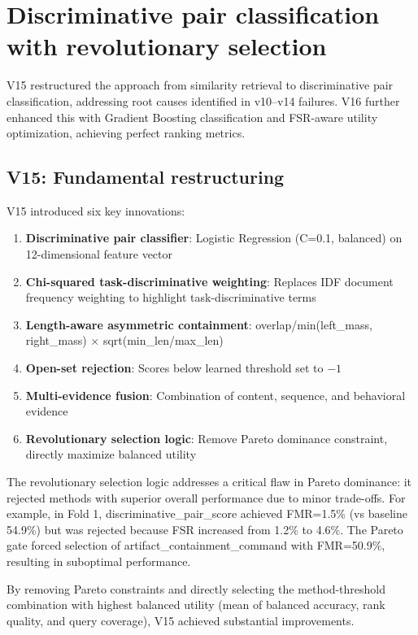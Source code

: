 \section{Discriminative pair classification with revolutionary selection}
\label{sec:balanced-innovation-v15-v16}

V15 restructured the approach from similarity retrieval to discriminative pair classification, addressing root causes identified in v10--v14 failures. V16 further enhanced this with Gradient Boosting classification and FSR-aware utility optimization, achieving perfect ranking metrics.

\subsection{V15: Fundamental restructuring}

V15 introduced six key innovations:
\begin{enumerate}
    \item \textbf{Discriminative pair classifier}: Logistic Regression (C=0.1, balanced) on 12-dimensional feature vector
    \item \textbf{Chi-squared task-discriminative weighting}: Replaces IDF document frequency weighting to highlight task-discriminative terms
    \item \textbf{Length-aware asymmetric containment}: overlap/min(left\_mass, right\_mass) $\times$ sqrt(min\_len/max\_len)
    \item \textbf{Open-set rejection}: Scores below learned threshold set to $-1$
    \item \textbf{Multi-evidence fusion}: Combination of content, sequence, and behavioral evidence
    \item \textbf{Revolutionary selection logic}: Remove Pareto dominance constraint, directly maximize balanced utility
\end{enumerate}

The revolutionary selection logic addresses a critical flaw in Pareto dominance: it rejected methods with superior overall performance due to minor trade-offs. For example, in Fold 1, discriminative\_pair\_score achieved FMR=1.5\% (vs baseline 54.9\%) but was rejected because FSR increased from 1.2\% to 4.6\%. The Pareto gate forced selection of artifact\_containment\_command with FMR=50.9\%, resulting in suboptimal performance.

By removing Pareto constraints and directly selecting the method-threshold combination with highest balanced utility (mean of balanced accuracy, rank quality, and query coverage), V15 achieved substantial improvements.

